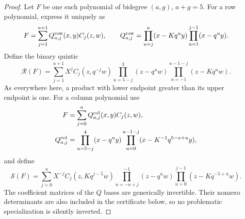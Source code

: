 \begin{proof}
Let $F$ be one such polynomial of bidegree $(a,g)$, $a+g=5$.
For a row polynomial, express it uniquely as
\begin{equation}\label{R20:rowbasis}
 F=\sum_{j=1}^{a+1} Q^{\rm row}_{a,j}(x,y) C_j(z,w),\qquad
 Q^{\rm row}_{a,j}=
 \prod_{u=j}^{a}(x-Kq^uy)\prod_{u=1}^{j-1}(x-q^uy).
\end{equation}
Define the binary quintic
\begin{equation}\label{R20:rowtransform}
 \mathcal R(F)=\sum_{j=1}^{a+1}X^j C_j(z,q^{-j}w)
       \prod_{u=5-j}^{3}(z-q^uw)
       \prod_{u=-1}^{a-1-j}(z-Kq^uw).
\end{equation}
As everywhere here, a product with lower endpoint greater than its
upper endpoint is one. For a column polynomial use
\begin{equation}\label{R20:colbasis}
 \begin{split}
 F&=\sum_{j=0}^{a}Q^{\rm col}_{a,j}(x,y)C_j(z,w),\\
 Q^{\rm col}_{a,j}&=
 \prod_{u=5-j}^{4}(x-q^uy)
 \prod_{u=0}^{a-1-j}(x-K^{-1}q^{5-a+u}y),
 \end{split}
\end{equation}
and define
\begin{equation}\label{R20:coltransform}
 \mathcal S(F)=\sum_{j=0}^{a}X^{-j}C_j(z,Kq^{j-5}w)
       \prod_{u=-a+j}^{-1}(z-q^uw)
       \prod_{u=0}^{j-1}(z-Kq^{-5+u}w).
\end{equation}
The coefficient matrices of the $Q$ bases are generically invertible.
Their nonzero determinants are also included in the certificate below,
so no problematic specialization is silently inverted.


\end{proof}
